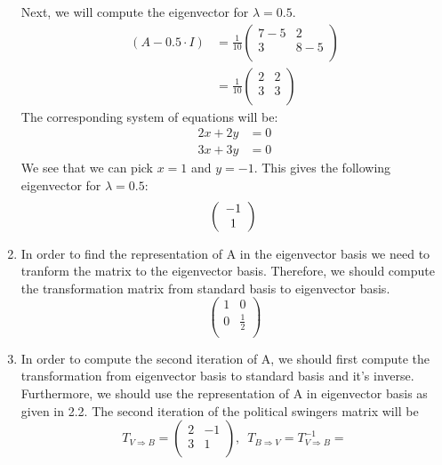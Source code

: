 \documentclass[a4paper]{article}
\begin{document}
\begin{enumerate}
  Next, we will compute the eigenvector for $\lambda = 0.5$.
  \begin{align*}
    (A - 0.5 \cdot I) &=
    \frac{1}{10}
    \left(
    \begin{array}{cc}
    7 - 5 & 2 \\
    3 & 8 - 5 \\
    \end{array}
    \right) \\
    &=
    \frac{1}{10}
    \left(
    \begin{array}{cc}
    2 & 2 \\
    3 & 3 \\
    \end{array}
    \right)
  \end{align*}
  The corresponding system of equations will be:
  \begin{align*}
    2x + 2y &= 0 \\
    3x + 3y &= 0
  \end{align*}
  We see that we can pick $x = 1$ and $y = -1$. This gives the following eigenvector for $\lambda = 0.5$:
  \[
  \left(
  \begin{array}{c}
  -1 \\
  1 \\
  \end{array}
  \right) \\
  \]
  \item In order to find the representation of A in the eigenvector basis we need to tranform the matrix to the eigenvector basis. Therefore, we should compute the transformation matrix from standard basis to eigenvector basis.
  \[
  \left(
  \begin{array}{cc}
  1 & 0 \\
  0 & \frac{1}{2} \\
  \end{array}
  \right)
  \]
  \item In order to compute the second iteration of A, we should first compute the transformation from eigenvector basis to standard basis and it's inverse. Furthermore, we should use the representation of A in eigenvector basis as given in 2.2. The second iteration of the political swingers matrix will be
  \[
  T_{V \Rightarrow B} =
  \left(
  \begin{array}{cc}
  2 & -1 \\
  3 & 1 \\
  \end{array}
  \right), \enspace
  T_{B \Rightarrow V} = T_{V \Rightarrow B}^{-1} =
\]
\end{enumerate}
\end{document}

